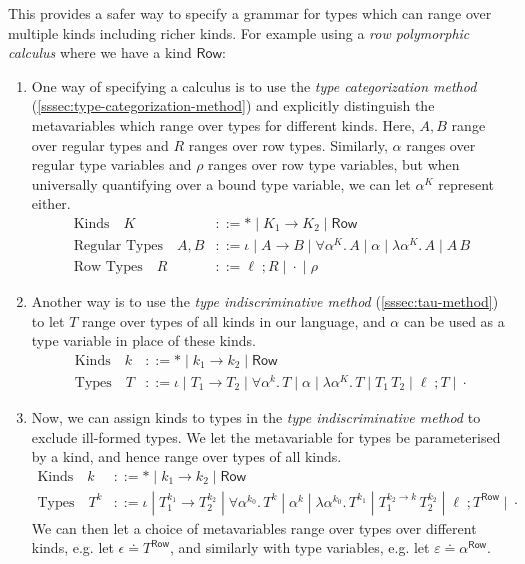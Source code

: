 \documentclass[acmsmall, 9pt]{article}
\begin{document}
\noindent
This provides a safer way to specify a grammar for types which can range over multiple kinds including richer kinds. For example using a \textit{row polymorphic calculus} where we have a kind $\mathsf{Row}$:
\begin{enumerate}[leftmargin=4mm]
  \item One way of specifying a calculus is to use the \textit{type categorization method} (\ref{sssec:type-categorization-method}) and explicitly distinguish the metavariables which range over types for different kinds. Here, $A, B$ range over regular types and $R$ ranges over row types. Similarly, $\alpha$ ranges over regular type variables and $\rho$ ranges over row type variables, but when universally quantifying over a bound type variable, we can let $\alpha^K$ represent either.
  \begin{align*}
    \text{Kinds} \quad K &::= * \; | \; K_1 \rightarrow K_2 \; | \; \mathsf{Row}\\
    \text{Regular Types} \quad  A, B &::= \iota \; | \; A \rightarrow B \; | \; \forall \alpha^K. \, A\; | \; \alpha \; | \; \lambda \alpha^K . \, A \; | \; A \, B\\
    \text{Row Types} \quad R &::= \ell \; ; R \; | \; \cdot \; | \; \rho
  \end{align*}
  \item Another way is to use the \textit{type indiscriminative method} (\ref{sssec:tau-method}) to let $T$ range over types of all kinds in our language, and $\alpha$ can be used as a type variable in place of these kinds.
  \begin{align*}
    \text{Kinds} \quad k &::= * \; | \; k_1 \rightarrow k_2 \; | \; \mathsf{Row}\\
    \text{Types} \quad T &::=  \iota \; | \; T_1 \rightarrow T_2 \; | \; \forall \alpha^k. \, T\; | \; \alpha \; | \; \lambda \alpha^K. \, T \; | \;T_1 \, T_2 \; | \; \ell \; ; T \; | \; \cdot
  \end{align*}
  \item Now, we can assign kinds to types in the \textit{type indiscriminative method} to exclude ill-formed types. We let the metavariable for types be parameterised by a kind, and hence range over types of all kinds.
  \begin{align*}
    \text{Kinds} \quad k &::= * \; | \; k_1 \rightarrow k_2 \; | \; \mathsf{Row}\\
    \text{Types} \quad T^k &::= \iota \; | \; T^{k_1}_1 \rightarrow T^{k_2}_2 \;  | \; \forall \alpha^{k_0}. \, T^{k}\; | \; \alpha^k \; | \; \lambda \alpha^{k_0}. \, T^{k_1} \; | \; T^{k_2 \rightarrow k}_1 \, T^{k_2}_2 \; | \; \ell \; ; T^{\mathsf{Row}} \; | \; \cdot
  \end{align*}
  We can then let a choice of metavariables range over types over different kinds, e.g. let $\epsilon \doteq T^{\mathsf{Row}}$, and similarly with type variables, e.g. let $\varepsilon \doteq \alpha^{\mathsf{Row}}$.
\end{enumerate}

\printbibliography
\end{document}
